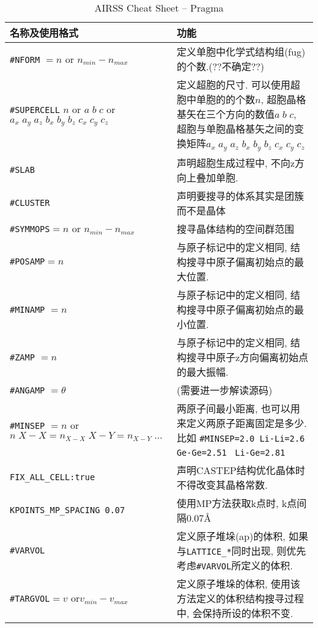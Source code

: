 \documentclass[a4paper, 10pt]{article}
\begin{document}
      \begin{table}
        \centering
        \caption{AIRSS Cheat Sheet -- Pragma}
        \label{AIRSS_Cheat_Sheet_Pragma}  
        \begin{tabular}{p{13em}|p{25em}}
          \toprule
          名称及使用格式 & 功能\\
          \midrule
          \verb|#NFORM| \(= n\) or \(n_{min} − n_{max}\) & 定义单胞中化学式结构组(fug)的个数.(??不确定??)\\
          \midrule
          \verb|#SUPERCELL| \(n\) or \(a\;b\;c\) or \(a_x\;a_y\;a_z\;b_x\;b_y\;b_z\;c_x\;c_y\;c_z\) & 定义超胞的尺寸. 可以使用超胞中单胞的的个数\(n\), 超胞晶格基矢在三个方向的数值\(a\;b\;c\), 超胞与单胞晶格基矢之间的变换矩阵\(a_x\;a_y\;a_z\;b_x\;b_y\;b_z\;c_x\;c_y\;c_z\)\\
          \midrule
          \verb|#SLAB|& 声明超胞生成过程中, 不向z方向上叠加单胞.\\
          \midrule
          \verb|#CLUSTER|& 声明要搜寻的体系其实是团簇而不是晶体\\
          \midrule
          \verb|#SYMMOPS|\(= n\) or \(n_{min} − n_{max}\)& 搜寻晶体结构的空间群范围\\
          \midrule
          \verb|#POSAMP|\(=n\)& 与原子标记中的定义相同, 结构搜寻中原子偏离初始点的最大位置.\\
          \midrule
          \verb|#MINAMP| \(= n\)&与原子标记中的定义相同, 结构搜寻中原子偏离初始点的最小位置.\\
          \midrule
          \verb|#ZAMP| \(= n\)& 与原子标记中的定义相同, 结构搜寻中原子z方向偏离初始点的最大振幅.\\
          \midrule
          \verb|#ANGAMP| \(=\theta\)& (需要进一步解读源码)\\
          \midrule
          \verb|#MINSEP| \(=n\) or \(n\;X-X=n_{X−X}\;X-Y=n_{X−Y}\;\ldots\)& 两原子间最小距离, 也可以用来定义两原子距离固定是多少. 比如
          \verb|#MINSEP=2.0 Li-Li=2.6 Ge-Ge=2.51| \verb| Li-Ge=2.81|\\
          \midrule
          \verb!FIX_ALL_CELL:true! & 声明CASTEP结构优化晶体时不得改变其晶格常数.\\
          \midrule
          \verb|KPOINTS_MP_SPACING 0.07| & 使用MP方法获取k点时, k点间隔0.07\AA\\
          \midrule
          \verb|#VARVOL| & 定义原子堆垛(ap)的体积, 如果与\verb|LATTICE_*|同时出现, 则优先考虑\verb|#VARVOL|所定义的体积.\\
          \midrule
          \verb|#TARGVOL|\(=v\) or\(v_{min}-v_{max}\) & 定义原子堆垛的体积, 使用该方法定义的体积结构搜寻过程中, 会保持所设的体积不变.\\

\end{tabular}
\end{table}
\end{document}
